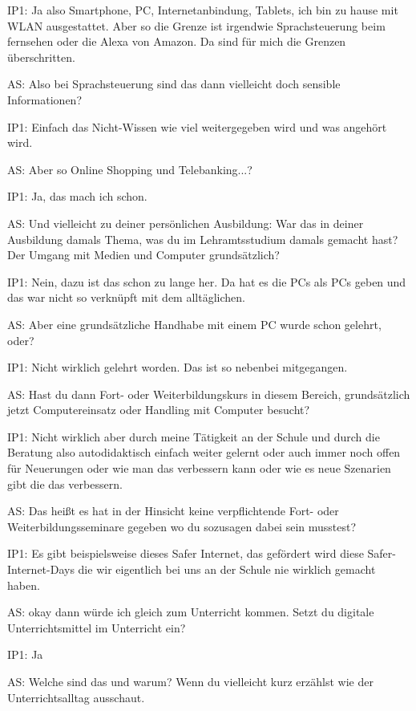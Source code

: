 \documentclass[fontsize=11pt,paper=a4]{scrbook}
\begin{document}
{\begin{itemize*}
\item[IP1:] Ja also Smartphone, PC, Internetanbindung, Tablets, ich bin zu hause mit WLAN ausgestattet. Aber so die Grenze ist irgendwie Sprachsteuerung beim fernsehen oder die Alexa von Amazon. Da sind für mich die Grenzen überschritten.
\item[AS:] Also bei Sprachsteuerung sind das dann vielleicht doch sensible Informationen?
\item[IP1:] Einfach das Nicht-Wissen wie viel weitergegeben wird und was angehört wird.
\item[AS:] Aber so Online Shopping und Telebanking...?
\item[IP1:] Ja, das mach ich schon.
\item[AS:] Und vielleicht zu deiner persönlichen Ausbildung: War das in deiner Ausbildung damals Thema, was du im Lehramtsstudium damals gemacht hast? Der Umgang mit Medien und Computer grundsätzlich?
\item[IP1:] Nein, dazu ist das schon zu lange her. Da hat es die PCs als PCs geben und das war nicht so verknüpft mit dem alltäglichen.
\item[AS:] Aber eine grundsätzliche Handhabe mit einem PC wurde schon gelehrt, oder?  
\item[IP1:] Nicht wirklich gelehrt worden. Das ist so nebenbei mitgegangen.
\item[AS:] Hast du dann Fort- oder Weiterbildungskurs in diesem Bereich, grundsätzlich jetzt Computereinsatz oder Handling mit Computer besucht?
\item[IP1:] Nicht wirklich aber durch meine Tätigkeit an der Schule und durch die Beratung also autodidaktisch einfach weiter gelernt oder auch immer noch offen für Neuerungen oder wie man das verbessern kann oder wie es neue Szenarien gibt die das verbessern.
\item[AS:] Das heißt es hat in der Hinsicht keine verpflichtende Fort- oder Weiterbildungsseminare gegeben wo du sozusagen dabei sein musstest?
\item[IP1:] Es gibt beispielsweise dieses Safer Internet, das gefördert wird diese Safer-Internet-Days die wir eigentlich bei uns an der Schule nie wirklich gemacht haben.
\item[AS:] okay dann würde ich gleich zum Unterricht kommen. Setzt du digitale Unterrichtsmittel im Unterricht ein?
\item[IP1:] Ja
\item[AS:] Welche sind das und warum? Wenn du vielleicht kurz erzählst wie der Unterrichtsalltag ausschaut.

\end{itemize*}}
\end{document}

